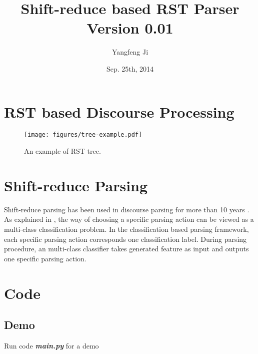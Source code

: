 \documentclass[12pt]{article}
\title{Shift-reduce based RST Parser Version 0.01}
\author{Yangfeng Ji}
\date{Sep. 25th, 2014}
\newcommand{\codefile}[1]{\textbf{\textit{#1}}}
\begin{document}
\maketitle
\section{RST based Discourse Processing}

\begin{figure}[H]
  \centering
  \texttt{[image: figures/tree-example.pdf]}
  \caption{An example of RST tree.}
  \label{fig:tree-example}
\end{figure}

\section{Shift-reduce Parsing}
Shift-reduce parsing has been used in discourse parsing for more than 10 years \cite{Ji:14:RepLearn,Marcu:99:ACL,Sagae:05:SR}. As explained in \cite{Ji:14:RepLearn},  the way of choosing a specific parsing action can be viewed as a multi-class classification problem. In the classification based parsing framework, each specific parsing action corresponds one classification label. During parsing procedure, an multi-class classifier takes generated feature as input and outputs one specific parsing action. 


\section{Code}

\subsection{Demo}
Run code \codefile{main.py} for a demo

\end{document}

